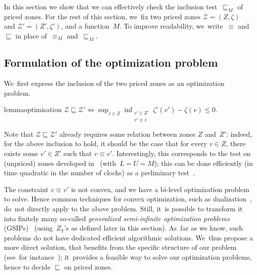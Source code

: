 In this section we show that we can effectively check the inclusion
test~$\sqsubseteq_M$ of priced zones. For the rest of this section, we~fix two
priced zones $\mathcal{Z} = (Z,\zeta)$ and $\mathcal{Z}' = (Z',\zeta')$, and a
function~$M$. To improve readability, we~write~$\equiv$ and~$\sqsubseteq$ in place
of~$\equiv_M$ and~$\sqsubseteq_M$.
\subsection{Formulation of the optimization problem}
\label{subsec:opt}

We~first express the inclusion of the two priced zones as an
optimization problem.

\begin{restatable}{lemma}{optimisation}
  \label{lemma:inclusion_sup}
  $\mathcal{Z} \sqsubseteq \mathcal{Z}' \iff \sup_{v \in Z}
  \inf_{\substack{v' \in Z'\\v' \equiv v}} \zeta'(v') - \zeta(v) \leq
  0$.
\end{restatable}


Note that $\mathcal{Z} \sqsubseteq \mathcal{Z}'$ already requires some
relation between zones $Z$ and~$Z'$: indeed, for the above inclusion
to hold, it should be the case that for every $v \in Z$, there exists
some $v' \in Z'$ such that $v \equiv v'$.  Interestingly, this
corresponds to the test on (unpriced) zones developed in~\cite{HSW12}
(with~$L=U=M$); this can be done efficiently (in time quadratic in the
number of clocks) as a preliminary test~\cite[Theorem 34]{HSW12}.

\begin{remark}
  The constraint $v \equiv v'$ is not convex, and we have a bi-level
  optimization problem to solve.
  Hence common techniques for convex optimization, such as
  dualization~\cite{BV04}, do~not directly apply to the above
  problem. Still, it~is possible to transform it into finitely many
  so-called \emph{generalized semi-infinite optimization problems}
  (GSIPs)~\cite{RS01} (using~$Z_Y$'s as defined later in this
  section).  As~far as we know, such problems do not have dedicated
  efficient algorithmic solutions. We~thus propose a more direct
  solution, that benefits from the specific structure of our problem
  (see~for instance~); it~provides a feasible way to
  solve our optimization problems, hence to decide $\sqsubseteq$ on
  priced zones.
\end{remark}

